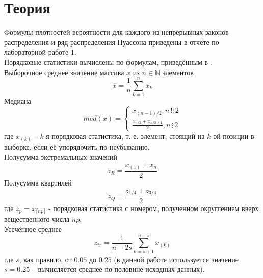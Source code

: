 \documentclass[report1.tex]{subfiles}
\begin{document}
\section{Теория}
Формулы плотностей вероятности для каждого из непрерывных законов распределения и ряд распределения Пуассона приведены в отчёте по лабораторной работе 1.\\
Порядковые статистики вычислены по формулам, приведённым в \cite{maksimov}.\\
Выборочное среднее значение массива $x$ из $n \in \mathds{N}$ элементов
\begin{equation} \label{eq:mean}
\overline{x} = \frac{1}{n} \sum_{k=1}^{n} x_k
\end{equation}
Медиана\\
\begin{equation} \label{eq:med}
med(x) = 
\begin{cases}
x_{(n-1)/2}, n \hspace{2pt} !\vdots \hspace{2pt} 2\\
\frac{x_{n/2} + x_{n/2 + 1}}{2}, n \hspace{2pt} \vdots \hspace{2pt} 2
\end{cases}
\end{equation}
где $x_(k)$ -- $k$-я порядковая статистика, т. е. элемент, стоящий на $k$-ой позиции в выборке, если её упорядочить по неубыванию.\\
Полусумма экстремальных значений\\
\begin{equation} \label{eq:zr}
z_R = \frac{x_{(1)} + x_{n}}{2}
\end{equation}
Полусумма квартилей\\
\begin{equation} \label{eq:zq}
z_Q = \frac{z_{1/4}+z_{3/4}}{2}
\end{equation}
где $z_p = x_{\lceil np \rceil}$ - порядковая статистика с номером, полученном округлением вверх вещественного числа $np$.\\
Усечённое среднее\\
\begin{equation} \label{eq:ztr}
z_{tr} = \frac{1}{n-2s} \sum_{k=s+1}^{n-s} x_{(k)}
\end{equation}
где $s$, как правило, от $0.05$ до $0.25$ (в данной работе используется значение $s=0.25$ -- вычисляется среднее по половине исходных данных).

\newpage
\end{document}
